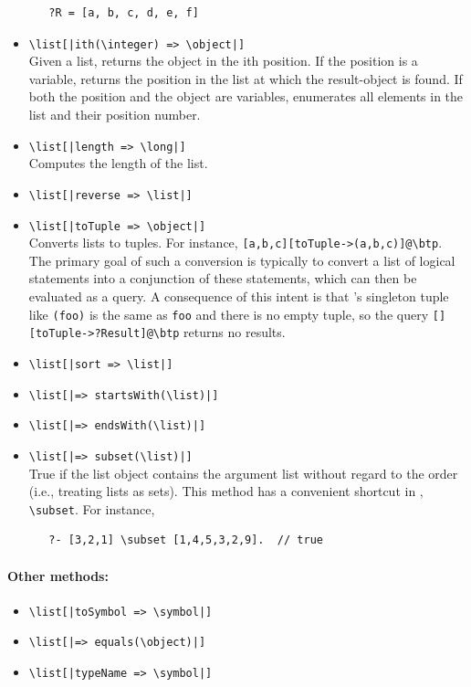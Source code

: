 \documentclass[11pt]{article}
\newcommand{\ERGO}{\mbox{\smaller{\ensuremath{\cal{E}}\smaller{{\sc{RGO}}}}}\xspace}
\newcommand{\FLSYSTEM}{\ERGO}
\newcommand{\bs}{\textbackslash}
\begin{document}
\begin{itemize}
\begin{verbatim}
   ?R = [a, b, c, d, e, f]
\end{verbatim}
\item {\tt \bs{}list[|ith(\bs{}integer) => \bs{}object|]}  \\
  Given a list, returns the object in the ith position. If the position is
  a variable, returns the position in the list at which the result-object
  is found. If both the position and the object are variables, enumerates
  all elements in the list and their position number.
\item {\tt \bs{}list[|length => \bs{}long|]}  
  \\
  Computes the length of the list.
\item {\tt \bs{}list[|reverse => \bs{}list|]}  
\item \texttt{\bs{}list[|toTuple => \bs{}object|]}
\\
Converts lists to tuples. For instance,
\texttt{[a,b,c][toTuple->(a,b,c)]@\bs{}btp}.  The primary goal of such  
a conversion is typically to convert a list of logical statements into a
conjunction of these statements, which can then be evaluated as a query.
A consequence of this intent is that
\FLSYSTEM's singleton tuple like \texttt{(foo)}  is the same as
\texttt{foo} and there is no empty tuple, so the query
\texttt{[][toTuple->?Result]@\bs{}btp} returns no results.
\item {\tt \bs{}list[|sort => \bs{}list|]}  
\item {\tt \bs{}list[|=> startsWith(\bs{}list)|]}  
\item {\tt \bs{}list[|=> endsWith(\bs{}list)|]}  
\item {\tt \bs{}list[|=> subset(\bs{}list)|]}  
  \\
  True if the list object contains the argument list without regard to the
  order (i.e., treating lists as sets).  This method has a convenient
  shortcut in \FLSYSTEM, \texttt{\bs{}subset}. For instance,
\begin{verbatim}
   ?- [3,2,1] \subset [1,4,5,3,2,9].  // true  
\end{verbatim}
\end{itemize}

\paragraph{Other methods:}
\begin{itemize}
\item {\tt \bs{}list[|toSymbol => \bs{}symbol|]}  
\item {\tt \bs{}list[|=> equals(\bs{}object)|]}  
\item {\tt \bs{}list[|typeName => \bs{}symbol|]}  
\end{itemize}
\end{document}
